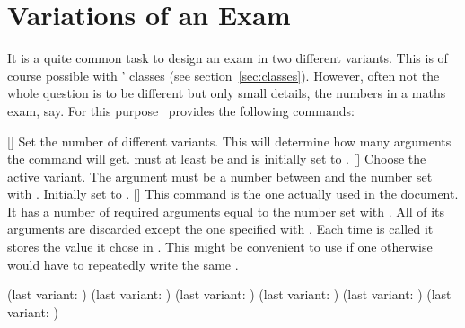 \documentclass[load-preamble+]{cnltx-doc}
\begin{document}
\section{Variations of an Exam}

It is a quite common task to design an exam in two different
variants.  This is of course possible with \ExSheets' classes (see
section~\ref{sec:classes}).  However, often not the whole question is to be
different but only small details, the numbers in a maths exam, say.  For this
purpose \ExSheets\ provides the following commands:
\begin{commands}
  []
    Set the number of different variants.  This will determine how many
    arguments the command  will get.   must at least be
     and is initially set to .
  []
    Choose the active variant.  The argument must be a number between 
    and the number set with .  Initially set to .
  []
    This command is the one actually used in the document.  It has a number of
    required arguments equal to the number set with .  All
    of its arguments are discarded except the one specified with
    .
    Each time  is called it stores the value it
    chose in .  This might be convenient to use if one
    otherwise would have to repeatedly write the same .
\end{commands}

\begin{example}
  (last variant: \lastvariant)
  (last variant: \lastvariant)
  (last variant: \lastvariant)
  (last variant: \lastvariant)
  (last variant: \lastvariant)
  (last variant: \lastvariant)
\end{example}
\end{document}
